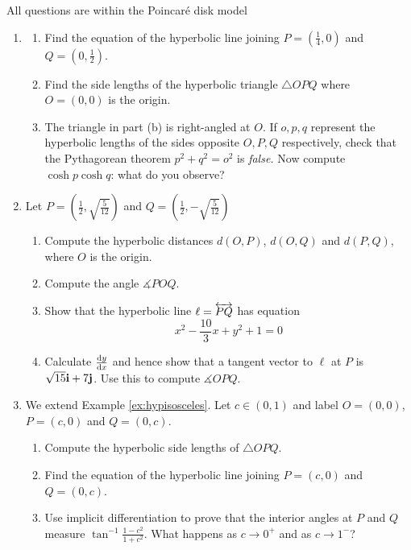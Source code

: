 \begin{exercises}
All questions are  within the Poincaré disk model
\begin{enumerate}
  \item\begin{enumerate}
    \item Find the equation of the hyperbolic line joining $P=(\frac 14,0)$ and $Q=(0,\frac 12)$.
    \item Find the side lengths of the hyperbolic triangle $\triangle OPQ$ where $O=(0,0)$ is the origin.
    \item The triangle in part (b) is right-angled at $O$. If $o,p,q$ represent the hyperbolic lengths of the sides opposite $O,P,Q$ respectively, check that the Pythagorean theorem $p^2+q^2=o^2$ is \emph{false.} Now compute $\cosh p\cosh q$: what do you observe?
  \end{enumerate}
  	
  \item Let $P=\left(\frac 12,\sqrt{\frac 5{12}}\right)$ and $Q=\left(\frac 12,-\sqrt{\frac 5{12}}\right)$
  \begin{enumerate}
    \item Compute the hyperbolic distances $d(O,P)$, $d(O,Q)$ and $d(P,Q)$, where $O$ is the origin.
    \item Compute the angle $\measuredangle POQ$.
	  \item Show that the hyperbolic line $\ell=\lin{PQ}$ has equation
		\[x^2-\frac{10}3x+y^2+1=0\]
  	\item Calculate $\diff[y]{x}$ and hence show that a tangent vector to $\ell$ at $P$ is $\sqrt{15}\vi+7\vj$. Use this to compute $\measuredangle OPQ$.
	\end{enumerate} 
	
  \item\label{exs:isorighthypextended} We extend Example \ref{ex:hypisosceles}. Let $c\in(0,1)$ and label $O=(0,0)$, $P=(c,0)$ and $Q=(0,c)$.
  \begin{enumerate}
    \item Compute the hyperbolic side lengths of $\triangle OPQ$.
    \item Find the equation of the hyperbolic line joining $P=(c,0)$ and $Q=(0,c)$.
    \item Use implicit differentiation to prove that the interior angles at $P$ and $Q$ measure $\tan^{-1}\frac{1-c^2}{1+c^2}$. What happens as $c\to 0^+$ and as $c\to 1^-$?
  \end{enumerate}
	

\end{enumerate}
\end{exercises}

